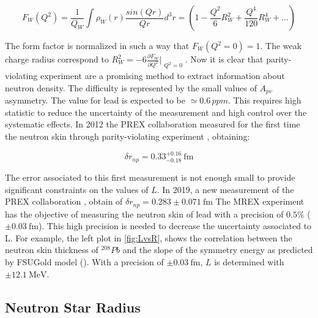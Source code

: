 \begin{equation}
F_{W}(Q^{2}) = \frac{1}{Q_{W}} \int \rho_{W}(r) \dfrac{sin(Qr)}{Qr} d^{3}r = (1 - \frac{Q^{2}}{6} R^{2}_{W} + \frac{Q^{4}}{120}R^{4}_{W} + ...)  
\end{equation}

The form factor is normalized in such a way that $F_{W}(Q^{2} = 0) = 1$. The weak charge radius correspond to $R^{2}_{W} = -6 \frac{\partial F_{W}}{\partial Q^{2}}\Bigr|_{\substack{Q^{2} = 0}}$. Now it is clear that parity-violating experiment are a promising method to extract information about neutron density. The difficulty is represented by the small values of $A_{pv}$ asymmetry. The value for lead is expected to be $\simeq 0.6 \, ppm$. This requires high statistic to reduce the uncertainty of the measurement and high control over the systematic effects. In 2012 the PREX collaboration measured for the first time the neutron skin through parity-violating experiment \cite{Abrahamyan:2012gp}, obtaining:

\begin{equation} \label{eq:Prex}
\delta r_{np} = 0.33^{+0.16}_{-0.18} \SI{}{\femto \meter}
\end{equation}

The error associated to this first measurement is not enough small to provide significant constraints on the values of $L$. In 2019, a new measurement of the PREX collaboration \cite{PREX:2021umo}, obtain of $\delta r_{np} = 0.283 \pm 0.071 \SI{}{\femto \meter}$ The MREX experiment has the objective of measuring the neutron skin of lead with a precision of $0.5 \%$  ($\pm \SI{0.03}{\femto \meter}$). This high precision is needed to decrease the uncertainty associated to L. For example, the left plot in \ref{fig:LvsR}, shows the correlation between the neutron skin thickness of $^{208}Pb$ and the slope of the symmetry energy as predicted by FSUGold model (\cite{Fattoyev_2011}). With a precision of $\pm \SI{0.03}{\femto \meter}$, $L$ is determined with $\pm \SI{12.1}{\mega \electronvolt}$. 

\subsection{Neutron Star Radius}

